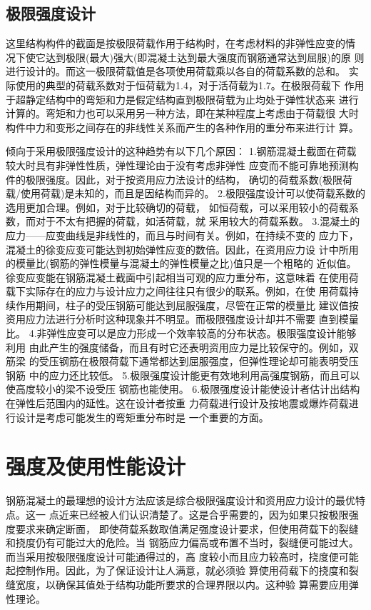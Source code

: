 \documentclass[12pt,a4paper]{book}
\begin{document}
\subsection{极限强度设计}

这里结构构件的截面是按极限荷载作用于结构时，在考虑材料的非弹性应变的情
况下使它达到极限(最大)强大(即混凝土达到最大强度而钢筋通常达到屈服)的原
则进行设计的。而这一极限荷载值是各项使用荷载乘以各自的荷载系数的总和。
实际使用的典型的荷载系数对于恒荷载为1.4，对于活荷载为1.7。在极限荷载下
作用于超静定结构中的弯矩和力是假定结构直到极限荷载为止均处于弹性状态来
进行计算的。弯矩和力也可以采用另一种方法，即在某种程度上考虑由于荷载很
大时构件中力和变形之间存在的非线性关系而产生的各种作用的重分布来进行计
算。

倾向于采用极限强度设计的这种趋势有以下几个原因：
1.钢筋混凝土截面在荷载较大时具有非弹性性质，弹性理论由于没有考虑非弹性
应变而不能可靠地预测构件的极限强度。因此，对于按资用应力法设计的结构，
确切的荷载系数(极限荷载/使用荷载)是未知的，而且是因结构而异的。
2.极限强度设计可以使荷载系数的选用更加合理。例如，对于比较确切的荷载，
如恒荷载，可以采用较小的荷载系数，而对于不太有把握的荷载，如活荷载，就
采用较大的荷载系数。
3.混凝土的应力——应变曲线是非线性的，而且与时间有关。例如，在持续不变的
应力下，混凝土的徐变应变可能达到初始弹性应变的数倍。因此，在资用应力设
计中所用的模量比(钢筋的弹性模量与混凝土的弹性模量之比)值只是一个粗略的
近似值。徐变应变能在钢筋混凝土截面中引起相当可观的应力重分布，这意味着
在使用荷载下实际存在的应力与设计应力之间往往只有很少的联系。例如，在使
用荷载持续作用期间，柱子的受压钢筋可能达到屈服强度，尽管在正常的模量比
建议值按资用应力法进行分析时这种现象并不明显。而极限强度设计却并不需要
直到模量比。
4.非弹性应变可以是应力形成一个效率较高的分布状态。极限强度设计能够利用
由此产生的强度储备，而且有时它还表明资用应力是比较保守的。例如，双筋梁
的受压钢筋在极限荷载下通常都达到屈服强度，但弹性理论却可能表明受压钢筋
中的应力还比较低。
5.极限强度设计能更有效地利用高强度钢筋，而且可以使高度较小的梁不设受压
钢筋也能使用。
6.极限强度设计能使设计者估计出结构在弹性后范围内的延性。这在设计者按重
力荷载进行设计及按地震或爆炸荷载进行设计是考虑可能发生的弯矩重分布时是
一个重要的方面。

\section{强度及使用性能设计}

钢筋混凝土的最理想的设计方法应该是综合极限强度设计和资用应力设计的最优特点。这一
点近来已经被人们认识清楚了。这是合乎需要的，因为如果只按极限强度要求来确定断面，
即使荷载系数取值满足强度设计要求，但使用荷载下的裂缝和挠度仍有可能过大的危险。当
钢筋应力偏高或布置不当时，裂缝便可能过大。而当采用按极限强度设计可能通得过的，高
度较小而且应力较高时，挠度便可能起控制作用。因此，为了保证设计让人满意，就必须验
算使用荷载下的挠度和裂缝宽度，以确保其值处于结构功能所要求的合理界限以内。这种验
算需要应用弹性理论。
\end{document}
